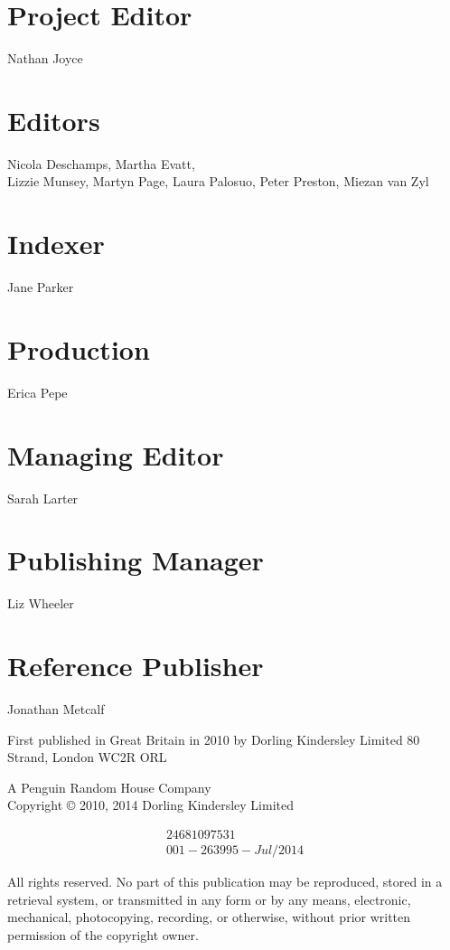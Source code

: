 \documentclass[10pt]{article}
\begin{document}
\section*{Project Editor}
Nathan Joyce

\section*{Editors}
Nicola Deschamps, Martha Evatt,\\
Lizzie Munsey, Martyn Page, Laura Palosuo, Peter Preston, Miezan van Zyl

\section*{Indexer}
Jane Parker

\section*{Production}
Erica Pepe

\section*{Managing Editor}
Sarah Larter

\section*{Publishing Manager}
Liz Wheeler

\section*{Reference Publisher}
Jonathan Metcalf

First published in Great Britain in 2010 by Dorling Kindersley Limited 80 Strand, London WC2R ORL

A Penguin Random House Company\\
Copyright © 2010, 2014 Dorling Kindersley Limited

$$
\begin{gathered}
24681097531 \\
001-263995-J u l / 2014
\end{gathered}
$$

All rights reserved. No part of this publication may be reproduced, stored in a retrieval system, or transmitted in any form or by any means, electronic, mechanical, photocopying, recording, or otherwise, without prior written permission of the copyright owner.
\end{document}
